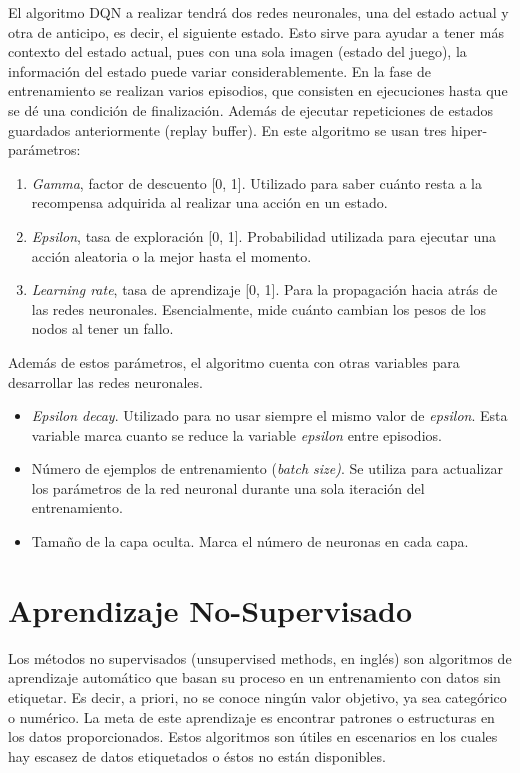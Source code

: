 		El algoritmo DQN a realizar tendrá dos redes neuronales, una del estado actual y otra de anticipo, es decir, el siguiente estado. Esto sirve para ayudar a tener más contexto del estado actual, pues con una sola imagen (estado del juego), la información del estado puede variar considerablemente. En la fase de entrenamiento se realizan varios episodios, que consisten en ejecuciones hasta que se dé una condición de finalización. Además de ejecutar repeticiones de estados guardados anteriormente (replay buffer). En este algoritmo se usan tres hiper-parámetros: 
		\begin{enumerate}
			\item \textit{Gamma}, factor de descuento [0, 1]. Utilizado para saber cuánto resta a la recompensa adquirida al realizar una acción en un estado.
			\item \textit{Epsilon}, tasa de exploración [0, 1]. Probabilidad utilizada para ejecutar una acción aleatoria o la mejor hasta el momento. 
			\item \textit{Learning rate}, tasa de aprendizaje [0, 1]. Para la propagación hacia atrás de las redes neuronales. Esencialmente, mide cuánto cambian los pesos de los nodos al tener un fallo.
		\end{enumerate}	
		
		Además de estos parámetros, el algoritmo cuenta con otras variables para desarrollar las redes neuronales. 
		\begin{itemize}
			\item \textit{Epsilon decay}. Utilizado para no usar siempre el mismo valor de \textit{epsilon}. Esta variable marca cuanto se reduce la variable \textit{epsilon} entre episodios.
			\item Número de ejemplos de entrenamiento (\textit{batch size)}. Se utiliza para actualizar los parámetros de la red neuronal durante una sola iteración del entrenamiento.
			\item Tamaño de la capa oculta. Marca el número de neuronas en cada capa.
		\end{itemize}
		
		
		
		
		
	

\section{Aprendizaje No-Supervisado}

	Los métodos no supervisados (unsupervised methods, en inglés) son algoritmos de aprendizaje automático que basan su proceso en un entrenamiento con datos sin etiquetar. Es decir, a priori, no se conoce ningún valor objetivo, ya sea categórico o numérico. La meta de este aprendizaje es encontrar patrones o estructuras en los datos proporcionados. Estos algoritmos son útiles en escenarios en los cuales hay escasez de datos etiquetados o éstos no están disponibles.
	
